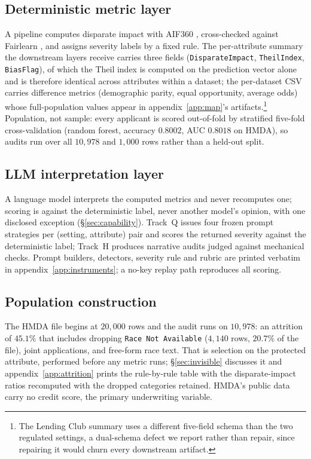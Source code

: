 \documentclass[sigconf,nonacm]{acmart}
\begin{document}
\subsection{Deterministic metric layer}
A pipeline computes disparate impact with
AIF360 \citep{aif360}, cross-checked against Fairlearn \citep{fairlearn}, and
assigns severity labels by a fixed rule. The per-attribute summary the
downstream layers receive carries three fields (\texttt{DisparateImpact},
\texttt{TheilIndex}, \texttt{BiasFlag}), of which the Theil index is
computed on the prediction vector alone and is therefore identical across
attributes within a dataset; the per-dataset CSV carries difference metrics
(demographic parity, equal opportunity, average odds) whose full-population
values appear in appendix~\ref{app:map}'s artifacts.\footnote{The Lending Club
summary uses a different five-field schema than the two regulated settings,
a dual-schema defect we report rather than repair, since repairing it would
churn every downstream artifact.} Population, not sample: every applicant is
scored out-of-fold by stratified five-fold cross-validation (random forest,
accuracy $0.8002$, AUC $0.8018$ on HMDA), so audits run over all $10{,}978$
and $1{,}000$ rows rather than a held-out split.

\subsection{LLM interpretation layer}
A language model interprets the computed
metrics and never recomputes one; scoring is against the deterministic label,
never another model's opinion, with one disclosed exception
(\S\ref{sec:capability}). Track~Q issues four frozen prompt strategies per
(setting, attribute) pair and scores the returned severity against the
deterministic label; Track~H produces narrative audits judged against
mechanical checks. Prompt builders, detectors, severity rule and rubric are
printed verbatim in appendix~\ref{app:instruments}; a no-key replay path
reproduces all scoring.

\subsection{Population construction}
The HMDA file begins at $20{,}000$ rows
and the audit runs on $10{,}978$: an attrition of $45.1\%$ that includes
dropping \texttt{Race Not Available} ($4{,}140$ rows, $20.7\%$ of the file),
joint applications, and free-form race text. That is selection on the
protected attribute, performed before any metric runs; \S\ref{sec:invisible}
discusses it and appendix~\ref{app:attrition} prints the rule-by-rule table
with the disparate-impact ratios recomputed with the dropped categories
retained. HMDA's public data carry no credit score, the primary underwriting
variable.
\end{document}
